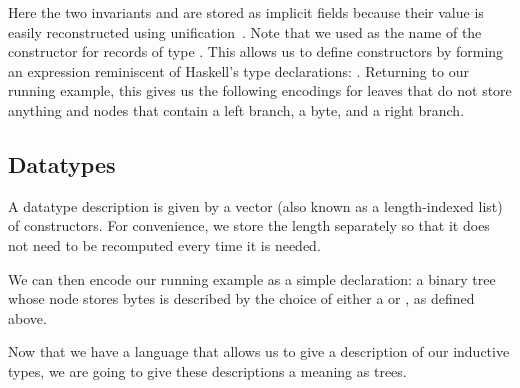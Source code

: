 Here the two invariants  and
 are stored as implicit fields
because their value is easily reconstructed using
unification~\citep{DBLP:conf/tlca/AbelP11}.
%
Note that we used \IdrisData{(::)} as the name of the
constructor for records of type .
This allows us to define constructors by forming an
expression reminiscent of Haskell's type declarations:
 \IdrisData{::} .
%
Returning to our running example, this gives us the following encodings for
leaves that do not store anything
and nodes that contain a left branch, a byte, and a right branch.

\noindent
\begin{minipage}[t]{.38\textwidth}
\end{minipage}\hfill
\begin{minipage}[t]{.58\textwidth}
\end{minipage}

\subsection{Datatypes}

A datatype description is given by a vector (also known as
a length-indexed list) of constructors.
%
For convenience, we store the length separately so that it
does not need to be recomputed every time it is needed.


We can then encode our running example as a simple 
declaration: a binary tree whose node stores bytes is described by the choice
of either a  or , as defined above.


Now that we have a language that allows us to give a description of our
inductive types, we are going to give these descriptions a meaning as trees.
